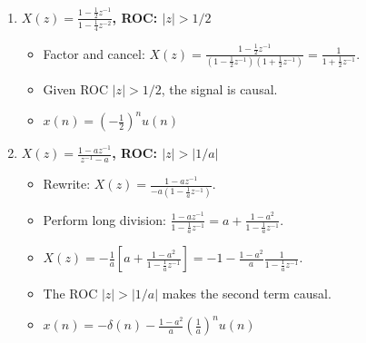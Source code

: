 \documentclass[a4paper,12pt]{article}
\begin{document}
\begin{enumerate}
    \item \textbf{$X(z) = \frac{1-\frac{1}{2}z^{-1}}{1-\frac{1}{4}z^{-2}}$, ROC: $|z| > 1/2$}
        \begin{itemize}
            \item Factor and cancel: $X(z) = \frac{1-\frac{1}{2}z^{-1}}{(1-\frac{1}{2}z^{-1})(1+\frac{1}{2}z^{-1})} = \frac{1}{1+\frac{1}{2}z^{-1}}$.
            \item Given ROC $|z|>1/2$, the signal is causal.
            \item $x(n) = (-\frac{1}{2})^n u(n)$
        \end{itemize}

    \item \textbf{$X(z) = \frac{1-az^{-1}}{z^{-1}-a}$, ROC: $|z| > |1/a|$}
        \begin{itemize}
            \item Rewrite: $X(z) = \frac{1-az^{-1}}{-a(1-\frac{1}{a}z^{-1})}$.
            \item Perform long division: $\frac{1-az^{-1}}{1-\frac{1}{a}z^{-1}} = a + \frac{1-a^2}{1-\frac{1}{a}z^{-1}}$.
            \item $X(z) = -\frac{1}{a} \left[ a + \frac{1-a^2}{1-\frac{1}{a}z^{-1}} \right] = -1 - \frac{1-a^2}{a} \frac{1}{1-\frac{1}{a}z^{-1}}$.
            \item The ROC $|z|>|1/a|$ makes the second term causal.
            \item $x(n) = -\delta(n) - \frac{1-a^2}{a} (\frac{1}{a})^n u(n)$
        \end{itemize}
\end{enumerate}
\end{document}
